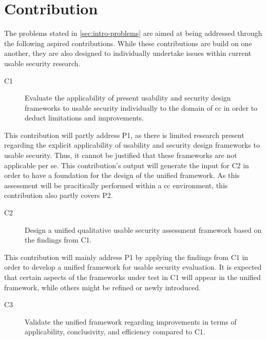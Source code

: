 \section{Contribution} \label{sec:intro-contribution}

The problems stated in \autoref{sec:intro-problems} are aimed at being addressed through the following aspired contributions. While these contributions are build on one another, they are also designed to individually undertake issues within current usable security research.

\begin{description}
	\item[C1] Evaluate the applicability of present usability and security design frameworks to usable security individually to the domain of \ac{cc} in order to deduct limitations and improvements.
\end{description}

This contribution will partly address P1, as there is limited research present regarding the explicit applicability of usability and security design frameworks to usable security. Thus, it cannot be justified that these frameworks are not applicable per se. This contribution's output will generate the input for C2 in order to have a foundation for the design of the unified framework. As this assessment will be pracitically performed within a \ac{cc} environment, this contribution also partly covers P2.

\begin{description}
	\item[C2] Design a unified qualitative usable security assessment framework based on the findings from C1.
\end{description}

This contribution will mainly address P1 by applying the findings from C1 in order to develop a unified framework for usable security evaluation. It is expected that certain aspects of the frameworks under test in C1 will appear in the unified framework, while others might be refined or newly introduced.
	
\begin{description}
	\item[C3] Validate the unified framework regarding improvements in terms of applicability, conclusivity, and efficiency compared to C1.
\end{description}

